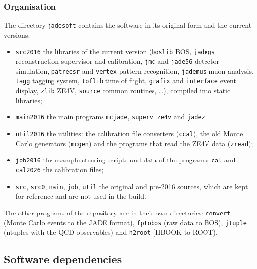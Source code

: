 \subsubsection{Organisation}
The directory \texttt{jadesoft} contains the software in its original form and the current versions:
\begin{itemize}
\item \texttt{src2016} the libraries of the current version (\texttt{boslib} BOS, \texttt{jadegs} reconstruction
supervisor and calibration, \texttt{jmc} and \texttt{jade56} detector simulation, \texttt{patrecsr} and
\texttt{vertex} pattern recognition, \texttt{jademus} muon analysis, \texttt{tagg} tagging system, \texttt{toflib} time of
flight, \texttt{grafix} and \texttt{interface} event display, \texttt{zlib} ZE4V, \texttt{source} common routines,
\dots), compiled into static libraries;
\item \texttt{main2016} the main programs \texttt{mcjade}, \texttt{superv}, \texttt{ze4v} and \texttt{jadez};
\item \texttt{util2016} the utilities: the calibration file converters (\texttt{ccal}), the old Monte Carlo generators
(\texttt{mcgen}) and the programs that read the ZE4V data (\texttt{zread});
\item \texttt{job2016} the example steering scripts and data of the programs; \texttt{cal} and \texttt{cal2026} the
calibration files;
\item \texttt{src}, \texttt{src0}, \texttt{main}, \texttt{job}, \texttt{util} the original and pre-2016 sources, which
are kept for reference and are not used in the build.
\end{itemize}
The other programs of the repository are in their own directories: \texttt{convert} (Monte Carlo events to the JADE
format), \texttt{fptobos} (raw data to BOS), \texttt{jtuple} (ntuples with the QCD observables) and \texttt{h2root}
(HBOOK to ROOT).

\subsection{Software dependencies}
\label{sec:deps}

